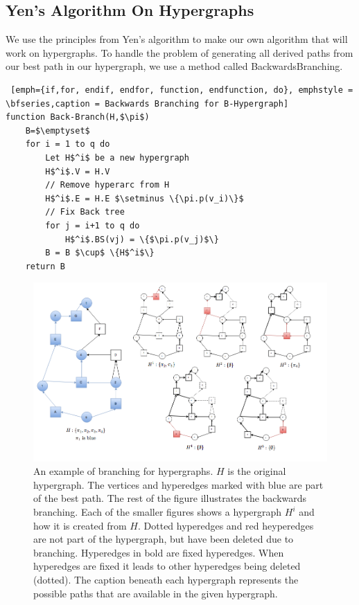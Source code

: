 \documentclass[a4paper,10pt,titlepage]{paper}
\begin{document}
\subsection{Yen's Algorithm On Hypergraphs}
We use the principles from Yen's algorithm to make our own algorithm that will work on hypergraphs. To handle the problem of generating all derived paths from our best path in our hypergraph, we use a method called BackwardsBranching. \cite{Fagerberg} \cite{Nielsen} \cite{Carsten}
\begin{lstlisting} [emph={if,for, endif, endfor, function, endfunction, do}, emphstyle = \bfseries,caption = Backwards Branching for B-Hypergraph]
function Back-Branch(H,$\pi$)
	B=$\emptyset$
	for i = 1 to q do 
		Let H$^i$ be a new hypergraph
		H$^i$.V = H.V
		// Remove hyperarc from H
		H$^i$.E = H.E $\setminus \{\pi.p(v_i)\}$
		// Fix Back tree
		for j = i+1 to q do
			H$^i$.BS(vj) = \{$\pi.p(v_j)$\}
		B = B $\cup$ \{H$^i$\}
	return B
\end{lstlisting}
\begin{figure}[H]
\hspace{-2cm}
\includegraphics[scale=0.5]{Billeder/BachBranch}
\caption{An example of branching for hypergraphs. $H$ is the original hypergraph. The vertices and hyperedges marked with blue are part of the best path. The rest of the figure illustrates the backwards branching. Each of the smaller figures shows a hypergraph $H^i$ and how it is created from $H$. Dotted hyperedges and red heyperedges are not part of the hypergraph, but have been deleted due to branching. Hyperedges in bold are fixed hyperedges. When hyperedges are fixed it leads to other hyperedges being deleted (dotted). The caption beneath each hypergraph represents the possible paths that are available in the given hypergraph.}
\end{figure}
\end{document}
